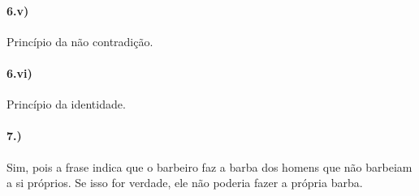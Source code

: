 \documentclass[pdftex,a4paper,12pt,brazil]{article} %
\begin{document}
\paragraph{6.v)} Princípio da não contradição.

\paragraph{6.vi)} Princípio da identidade.

\paragraph{7.)} Sim, pois a frase indica que o barbeiro faz a barba
dos homens que não barbeiam a si próprios. Se isso for verdade, ele não
poderia fazer a própria barba.







%


\end{document}
